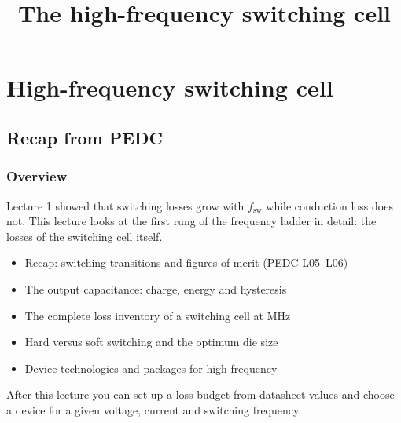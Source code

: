 \title[High-frequency switching cell]{The high-frequency switching cell}
\section{High-frequency switching cell}

\begin{frame}[plain]
	\titlepage
\end{frame}

\subsection{Recap from PEDC}

\begin{frame}
	\frametitle{Overview}
	Lecture 1 showed that switching losses grow with $f_\mathrm{sw}$ while conduction loss does not. This lecture looks at the first rung of the frequency ladder in detail: the losses of the switching cell itself.
	\begin{itemize}
		\item Recap: switching transitions and figures of merit (PEDC L05--L06)
		\item The output capacitance: charge, energy and hysteresis
		\item The complete loss inventory of a switching cell at MHz
		\item Hard versus soft switching and the optimum die size
		\item Device technologies and packages for high frequency
	\end{itemize}
	After this lecture you can set up a loss budget from datasheet values and choose a device for a given voltage, current and switching frequency.
\end{frame}


